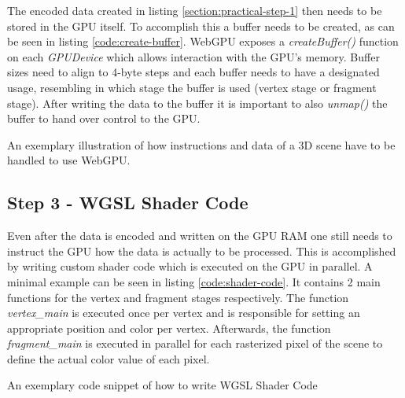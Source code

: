 The encoded data created in listing \ref*{section:practical-step-1} then needs to be stored in the GPU itself. To accomplish this a buffer needs to be created, as can be seen in listing \ref*{code:create-buffer}. 
WebGPU exposes a \emph{createBuffer()} function on each \emph{GPUDevice} which allows interaction with the GPU's memory. Buffer sizes need to align to 4-byte steps and each buffer needs to 
have a designated usage, resembling in which stage the buffer is used (vertex stage or fragment stage). After writing the data to the buffer it is important to also \emph{unmap()} the buffer 
to hand over control to the GPU. 

\begin{listing}
  \centering

  \caption[Code Snippet: \emph{createBuffer}]
  {
    An exemplary illustration of how instructions and data of a 3D scene have to be handled
    to use WebGPU.
  }
  \label{code:create-buffer}
\end{listing}


\subsection{Step 3 - WGSL Shader Code}
\label{section:shader-code}

Even after the data is encoded and written on the GPU RAM one still needs to instruct the GPU how the data is actually to be processed. This is accomplished by writing custom
shader code which is executed on the GPU in parallel. A minimal example can be seen in listing \ref*{code:shader-code}.  It contains 2 main functions for the vertex and fragment stages respectively. 
The function \emph{vertex\_main} is executed once per vertex and is responsible for setting an appropriate position and color per vertex. Afterwards, the function \emph{fragment\_main} is 
executed in parallel for each rasterized pixel of the scene to define the actual color value of each pixel. 

\begin{listing}

  \centering

  \caption[Code Snippet: WebGPU Shader Code]
  {
    An exemplary code snippet of how to write WGSL Shader Code
  }
  \label{code:shader-code}
\end{listing}

